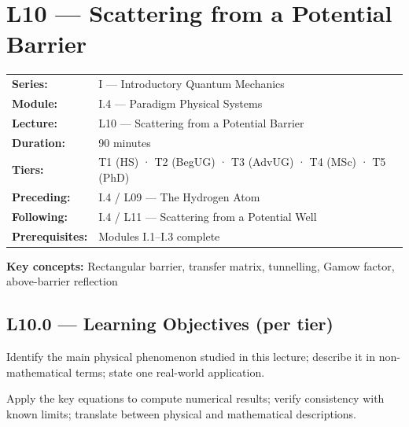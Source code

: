 \renewcommand{\lectureCode}{I.4 / L10}

\section*{L10 — Scattering from a Potential Barrier}
\label{sec:L10}

\begin{tcolorbox}[lecturebox, title={Module I.4 / L10 — Metadata}]
\begin{tabular}{@{}ll@{}}
\textbf{Series:}    & I — Introductory Quantum Mechanics \\
\textbf{Module:}    & I.4 — Paradigm Physical Systems \\
\textbf{Lecture:}   & L10 — Scattering from a Potential Barrier \\
\textbf{Duration:}  & 90 minutes \\
\textbf{Tiers:}     & T1 (HS) · T2 (BegUG) · T3 (AdvUG) · T4 (MSc) · T5 (PhD) \\
\textbf{Preceding:} & I.4 / L09 — The Hydrogen Atom \\
\textbf{Following:} & I.4 / L11 — Scattering from a Potential Well \\
\textbf{Prerequisites:} & Modules I.1–I.3 complete \\
\end{tabular}

\medskip
\textbf{Key concepts:} Rectangular barrier, transfer matrix, tunnelling, Gamow factor, above-barrier reflection
\end{tcolorbox}

\subsection*{L10.0 — Learning Objectives (per tier)}
\label{sec:L10.0}

\quad
Identify the main physical phenomenon studied in this lecture; describe it in
non-mathematical terms; state one real-world application.

\quad
Apply the key equations to compute numerical results; verify consistency with
known limits; translate between physical and mathematical descriptions.

